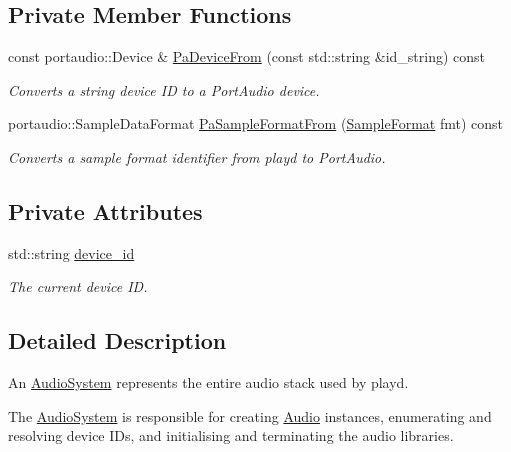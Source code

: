 \subsection*{Private Member Functions}
\begin{DoxyCompactItemize}
\item 
const portaudio\+::\+Device \& \hyperlink{classAudioSystem_a513a0de4748574e25cba443f28949a90}{Pa\+Device\+From} (const std\+::string \&id\+\_\+string) const 
\begin{DoxyCompactList}\small\item\em Converts a string device I\+D to a Port\+Audio device. \end{DoxyCompactList}\item 
portaudio\+::\+Sample\+Data\+Format \hyperlink{classAudioSystem_aac640b14ad80c2518539bcafe9f4b5ac}{Pa\+Sample\+Format\+From} (\hyperlink{sample__formats_8hpp_a21cca244e782ff3acc8805fb73236772}{Sample\+Format} fmt) const 
\begin{DoxyCompactList}\small\item\em Converts a sample format identifier from playd to Port\+Audio. \end{DoxyCompactList}\end{DoxyCompactItemize}
\subsection*{Private Attributes}
\begin{DoxyCompactItemize}
\item 
\hypertarget{classAudioSystem_a3071e6d8643b3d0275ba63820e6e0072}{std\+::string \hyperlink{classAudioSystem_a3071e6d8643b3d0275ba63820e6e0072}{device\+\_\+id}}\label{classAudioSystem_a3071e6d8643b3d0275ba63820e6e0072}

\begin{DoxyCompactList}\small\item\em The current device I\+D. \end{DoxyCompactList}\end{DoxyCompactItemize}


\subsection{Detailed Description}
An \hyperlink{classAudioSystem}{Audio\+System} represents the entire audio stack used by playd. 

The \hyperlink{classAudioSystem}{Audio\+System} is responsible for creating \hyperlink{classAudio}{Audio} instances, enumerating and resolving device I\+Ds, and initialising and terminating the audio libraries.

